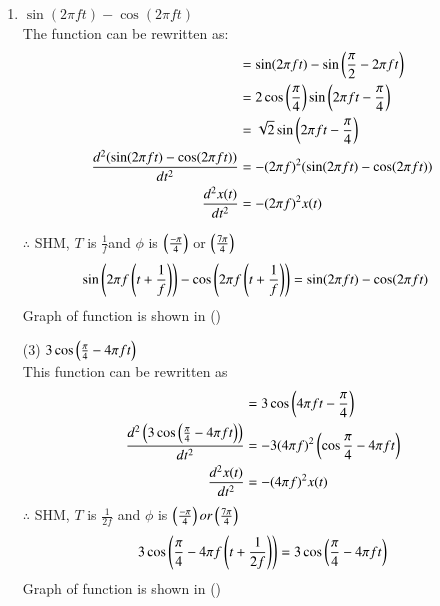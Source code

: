 \documentclass[journal,12pt,onecolumn]{IEEEtran}
\theoremstyle{remark}
\begin{document}
   \begin{enumerate}
   \begin{table}[!ht]
    \centering
        
    \caption{input parameters}
    \label{tab:}
\end{table}
\item $\sin(2\pi f t)- \cos(2\pi f t)$\\
The function can be rewritten as:
 \begin{align}
  &= \sin(2\pi f t) - \sin\left(\frac{\pi}{2} - 2\pi f t\right)\\
  &=2 \cos\left(\frac{\pi}{4}\right) \sin\left(2\pi f t - \frac{\pi}{4}\right)\\
  &=\sqrt{2}\sin\left(2\pi f t - \frac{\pi}{4}\right)\\
  \frac{d^2(\sin(2\pi f t)- \cos(2\pi f t))}{dt^2}&=-(2\pi f)^2(\sin(2\pi f t)- \cos(2\pi f t))\\
     \frac{d^2 x(t)}{dt^2} &= - (2\pi f)^2 x(t)\\
     \end{align}
     
 $\therefore$ SHM, $T$ is $\frac{1}{f}$and $\phi$ is $\left(\frac{-\pi}{4}\right)$ or $\left(\frac{7\pi}{4}\right)$\\
 
 \begin{align}
 \sin\left(2\pi f\left(t+\frac{1}{f}\right)\right)- \cos\left(2\pi f\left(t+\frac{1}{f}\right)\right)&=\sin(2\pi f t)- \cos(2\pi f t)
 \end{align}
Graph of function is shown in ()
\\
    \item[(3)] $3\cos\left(\frac{\pi}{4}-4\pi f t\right)$\\

This function can be rewritten as\\ 
 \begin{align}
  &=3\cos\left(4\pi f t-\frac{\pi}{4}\right)\\
  \frac{d^2\left(3\cos\left(\frac{\pi}{4}-4\pi f t\right)\right)}{dt^2}&=-3(4\pi f)^2\left(\cos\frac{\pi}{4}-4\pi f t\right)\\
  \frac{d^2 x(t)}{dt^2} &= - (4\pi f)^2 x(t)
 \end{align}
 $\therefore$  SHM, $T$ is $\frac{1}{2f}$  and  $\phi$ is $\left(\frac{-\pi}{4}\right) or \left(\frac{7\pi}{4}\right) $\\
 \begin{align}
 3\cos\left(\frac{\pi}{4}-4\pi f \left(t+\frac{1}{2f}\right)\right)=3\cos\left(\frac{\pi}{4}-4\pi f t\right)\\
 \end{align}
 Graph of function is shown in ()
 \\


\end{enumerate}
\end{document}
